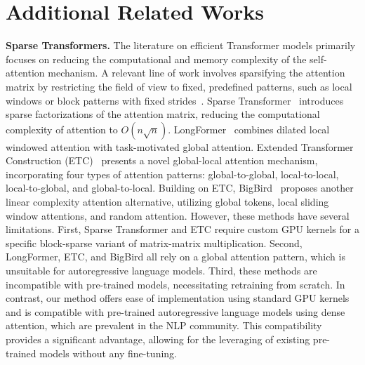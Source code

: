 \section{Additional Related Works}
\textbf{Sparse Transformers.} The literature on efficient Transformer models primarily focuses on reducing the computational and memory complexity of the self-attention mechanism. A relevant line of work involves sparsifying the attention matrix by restricting the field of view to fixed, predefined patterns, such as local windows or block patterns with fixed strides~\citep{tay2022efficient}.
Sparse Transformer~\citep{child2019generating} introduces sparse factorizations of the attention matrix, reducing the computational complexity of attention to $O(n\sqrt{n})$. LongFormer~\citep{beltagy2020longformer} combines dilated local windowed attention with task-motivated global attention. Extended Transformer Construction (ETC)~\cite{ainslie2020etc} presents a novel global-local attention mechanism, incorporating four types of attention patterns: global-to-global, local-to-local, local-to-global, and global-to-local. Building on ETC, BigBird~\citep{zaheer2020big} proposes another linear complexity attention alternative, utilizing global tokens, local sliding window attentions, and random attention.
However, these methods have several limitations. First, Sparse Transformer and ETC require custom GPU kernels for a specific block-sparse variant of matrix-matrix multiplication. Second, LongFormer, ETC, and BigBird all rely on a global attention pattern, which is unsuitable for autoregressive language models. Third, these methods are incompatible with pre-trained models, necessitating retraining from scratch.
In contrast, our method offers ease of implementation using standard GPU kernels and is compatible with pre-trained autoregressive language models using dense attention, which are prevalent in the NLP community. This compatibility provides a significant advantage, allowing for the leveraging of existing pre-trained models without any fine-tuning.

